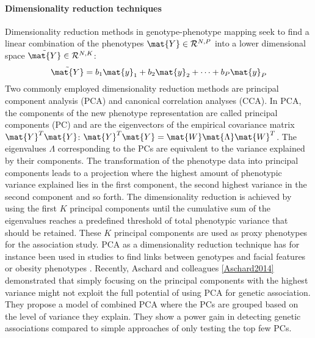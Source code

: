 \paragraph{Dimensionality reduction techniques}  
Dimensionality reduction methods in genotype-phenotype mapping seek to find a linear combination of the phenotypes \(\mat{Y} \in \mathcal{R}^{N,P}\) into a lower dimensional space \(\tilde{\mat{Y}} \in \mathcal{R}^{N,K}\):
\begin{equation}
\tilde{\mat{Y}} = b_1\mat{y}_1 + b_2\mat{y}_2 + \dots + b_P\mat{y}_P
\end{equation}
Two commonly employed dimensionality reduction methods are principal component analysis (PCA) and canonical correlation analyses (CCA). In PCA, the components of the new phenotype representation are called principal components (PC) and are the eigenvectors  of the empirical covariance matrix \(\mat{Y}^T\mat{Y}\): \(\mat{Y}^T\mat{Y} = \mat{W}\mat{\Lambda}\mat{W}^T\). The eigenvalues \(\Lambda\) corresponding to the PCs are equivalent to the variance explained by their components. The transformation of the phenotype data into principal components leads to a projection where the highest amount of phenotypic variance explained lies in the first component, the second highest variance in the second component and so forth. The dimensionality reduction is achieved by using the first \(K\) principal components until the cumulative sum of the eigenvalues reaches a predefined threshold of total phenotypic variance that should be retained. These \(K\) principal components are used as proxy phenotypes for the association study. PCA as a dimensionality reduction technique has for instance been used in studies to find links between genotypes and facial features or obesity phenotypes \citep{Liu2012,Claes2014,He2008}. Recently, Aschard and colleagues \ref{Aschard2014} demonstrated that simply focusing on the principal components with the highest variance might not exploit the full potential of using PCA for genetic association. They propose a model of combined PCA where the PCs are grouped based on the level of variance they explain. They show a power gain in detecting genetic associations compared to simple approaches of only testing the top few PCs.


